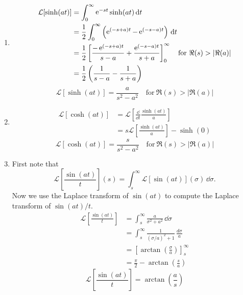 {\begin{Solution}
\begin{enumerate}
\begin{align*}
    \end{align*}
    \[
    \boxed{
      \mathcal{L} [ \cos(a t) ] = \frac{ s }{ s^2 + a^2 }
      \quad \mathrm{for}\ \Re(s) > 0
      }
    \]
  \item
    \begin{align*}
      \mathcal{L} [ \sinh(a t) ]
      &= \int_0^\infty \mathop{\mathrm{e}}\nolimits^{-s t} \sinh(a t) \,\mathrm{d} t 
      \\
      &= \frac{1}{2} \int_0^\infty \left( \mathop{\mathrm{e}}\nolimits^{(-s + a) t} - \mathop{\mathrm{e}}\nolimits^{(-s - a) t} \right) \,\mathrm{d} t 
      \\
      &= \frac{1}{2} \left[ \frac{ - \mathop{\mathrm{e}}\nolimits^{(-s + a) t} }{s - a}
        + \frac{ \mathop{\mathrm{e}}\nolimits^{(-s - a) t} }{ s + a } \right]_0^\infty
      \quad \mathrm{for}\ \Re(s) > |\Re(a)| 
      \\
      &= \frac{1}{2} \left( \frac{1}{ s - a } 
        - \frac{1}{ s + a } \right) 
    \end{align*}
    \[
    \boxed{
      \mathcal{L} [ \sinh(a t) ] = \frac{ a }{ s^2 - a^2 }
      \quad \mathrm{for}\ \Re(s) > |\Re(a)|
      }
    \]
  \item
    \begin{align*}
      \mathcal{L} [ \cosh(a t) ]
      &= \mathcal{L} \left[ \frac{\dd}{\dd t} \frac{\sinh(a t)}{a} \right] 
      \\
      &= s \mathcal{L} \left[ \frac{\sinh(a t)}{a} \right] - \sinh(0)
    \end{align*}
    \[
    \boxed{
      \mathcal{L} [ \cosh(a t) ] = \frac{ s }{ s^2 - a^2 }
      \quad \mathrm{for}\ \Re(s) > |\Re(a)|
      }
    \]
  \item
    First note that
    \[
    \mathcal{L} \left[ \frac{\sin(a t)}{t} \right](s)
    = \int_s^\infty \mathcal{L} [ \sin(a t) ](\sigma) \,\dd \sigma.
    \]
    Now we use the Laplace transform of $\sin(a t)$ to compute the Laplace 
    transform of $\sin(a t)/t$.
    \begin{align*}
      \mathcal{L} \left[ \frac{\sin(a t)}{t} \right]
      &= \int_s^\infty \frac{a}{ \sigma^2 + a^2 } \,\dd \sigma \\
      &= \int_s^\infty \frac{1}{ (\sigma/a)^2 + 1 } \,
      \frac{ d \sigma }{ a } \\
      &= \left[ \arctan\left( \frac{\sigma}{a} \right) \right]_s^\infty \\
      &= \frac{\pi}{2} - \arctan \left( \frac{s}{a} \right)
    \end{align*}
    \[
    \boxed{
      \mathcal{L} \left[ \frac{\sin(a t)}{t} \right] 
      = \arctan \left( \frac{ a }{ s } \right)
}\]
\end{enumerate}
\end{Solution}}

